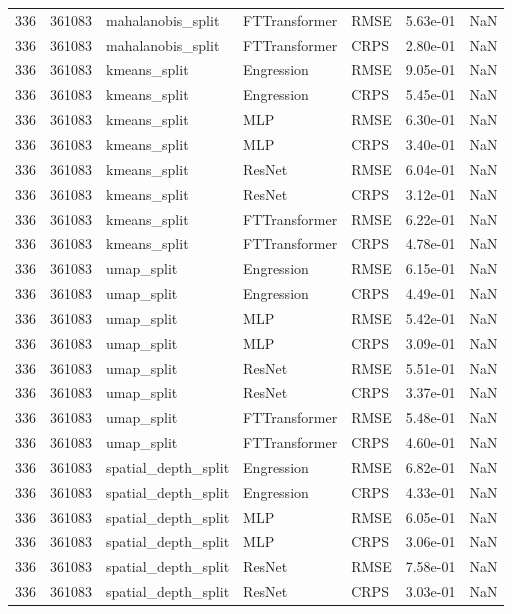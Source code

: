 \begin{tabular}{rrlllrr}
336 & 361083 & mahalanobis\_split & FTTransformer & RMSE & 5.63e-01 & NaN \\
336 & 361083 & mahalanobis\_split & FTTransformer & CRPS & 2.80e-01 & NaN \\
336 & 361083 & kmeans\_split & Engression & RMSE & 9.05e-01 & NaN \\
336 & 361083 & kmeans\_split & Engression & CRPS & 5.45e-01 & NaN \\
336 & 361083 & kmeans\_split & MLP & RMSE & 6.30e-01 & NaN \\
336 & 361083 & kmeans\_split & MLP & CRPS & 3.40e-01 & NaN \\
336 & 361083 & kmeans\_split & ResNet & RMSE & 6.04e-01 & NaN \\
336 & 361083 & kmeans\_split & ResNet & CRPS & 3.12e-01 & NaN \\
336 & 361083 & kmeans\_split & FTTransformer & RMSE & 6.22e-01 & NaN \\
336 & 361083 & kmeans\_split & FTTransformer & CRPS & 4.78e-01 & NaN \\
336 & 361083 & umap\_split & Engression & RMSE & 6.15e-01 & NaN \\
336 & 361083 & umap\_split & Engression & CRPS & 4.49e-01 & NaN \\
336 & 361083 & umap\_split & MLP & RMSE & 5.42e-01 & NaN \\
336 & 361083 & umap\_split & MLP & CRPS & 3.09e-01 & NaN \\
336 & 361083 & umap\_split & ResNet & RMSE & 5.51e-01 & NaN \\
336 & 361083 & umap\_split & ResNet & CRPS & 3.37e-01 & NaN \\
336 & 361083 & umap\_split & FTTransformer & RMSE & 5.48e-01 & NaN \\
336 & 361083 & umap\_split & FTTransformer & CRPS & 4.60e-01 & NaN \\
336 & 361083 & spatial\_depth\_split & Engression & RMSE & 6.82e-01 & NaN \\
336 & 361083 & spatial\_depth\_split & Engression & CRPS & 4.33e-01 & NaN \\
336 & 361083 & spatial\_depth\_split & MLP & RMSE & 6.05e-01 & NaN \\
336 & 361083 & spatial\_depth\_split & MLP & CRPS & 3.06e-01 & NaN \\
336 & 361083 & spatial\_depth\_split & ResNet & RMSE & 7.58e-01 & NaN \\
336 & 361083 & spatial\_depth\_split & ResNet & CRPS & 3.03e-01 & NaN \\

\end{tabular}
